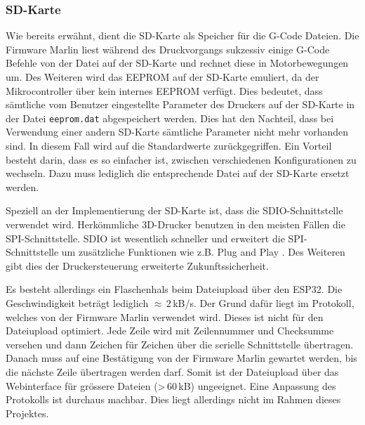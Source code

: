 \subsubsection{SD-Karte}
\label{sec:SDKarte}



Wie bereits erwähnt, dient die SD-Karte als Speicher für die G-Code Dateien. Die Firmware Marlin liest während des Druckvorgangs sukzessiv einige G-Code Befehle von der Datei auf der SD-Karte und rechnet diese in Motorbewegungen um. Des Weiteren wird das EEPROM auf der SD-Karte emuliert, da der Mikrocontroller über kein internes EEPROM verfügt. Dies bedeutet, dass sämtliche vom Benutzer eingestellte Parameter des Druckers auf der SD-Karte in der Datei \texttt{eeprom.dat} abgespeichert werden. Dies hat den Nachteil, dass bei Verwendung einer andern SD-Karte sämtliche Parameter nicht mehr vorhanden sind. In diesem Fall wird auf die Standardwerte zurückgegriffen. Ein Vorteil besteht darin, dass es so einfacher ist, zwischen verschiedenen Konfigurationen zu wechseln. Dazu muss lediglich die entsprechende Datei auf der SD-Karte ersetzt werden.

Speziell an der Implementierung der SD-Karte ist, dass die SDIO-Schnittstelle verwendet wird. Herkömmliche 3D-Drucker benutzen in den meisten Fällen die SPI-Schnittstelle. SDIO ist wesentlich schneller und erweitert die SPI-Schnittstelle um zusätzliche Funktionen wie z.B. Plug and Play \cite{SDIO}. Des Weiteren gibt dies der Druckersteuerung erweiterte Zukunftssicherheit.

Es besteht allerdings ein Flaschenhals beim Dateiupload über den ESP32. Die Geschwindigkeit beträgt lediglich $\approx\,2\,$kB/s. Der Grund dafür liegt im Protokoll, welches von der Firmware Marlin verwendet wird. Dieses ist nicht für den Dateiupload optimiert. Jede Zeile wird mit Zeilennummer und Checksumme versehen und dann Zeichen für Zeichen über die serielle Schnittstelle übertragen. Danach muss auf eine Bestätigung von der Firmware Marlin gewartet werden, bis die nächste Zeile übertragen werden darf. Somit ist der Dateiupload über das Webinterface für grössere Dateien (>\,60\,kB) ungeeignet. Eine Anpassung des Protokolls ist durchaus machbar. Dies liegt allerdings nicht im Rahmen dieses Projektes.
